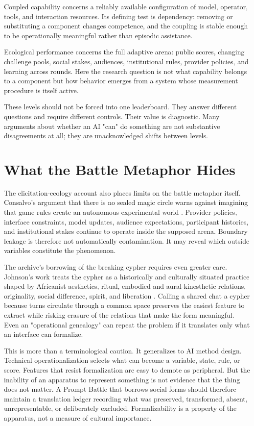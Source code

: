 \documentclass[11pt]{article}
\begin{document}
Coupled capability concerns a reliably available configuration of model, operator, tools, and interaction resources. Its defining test is dependency: removing or substituting a component changes competence, and the coupling is stable enough to be operationally meaningful rather than episodic assistance.

Ecological performance concerns the full adaptive arena: public scores, changing challenge pools, social stakes, audiences, institutional rules, provider policies, and learning across rounds. Here the research question is not what capability belongs to a component but how behavior emerges from a system whose measurement procedure is itself active.

These levels should not be forced into one leaderboard. They answer different questions and require different controls. Their value is diagnostic. Many arguments about whether an AI "can" do something are not substantive disagreements at all; they are unacknowledged shifts between levels.

\section{What the Battle Metaphor Hides}
The elicitation-ecology account also places limits on the battle metaphor itself. Consalvo's argument that there is no sealed magic circle warns against imagining that game rules create an autonomous experimental world \cite{consalvo2009magic}. Provider policies, interface constraints, model updates, audience expectations, participant histories, and institutional stakes continue to operate inside the supposed arena. Boundary leakage is therefore not automatically contamination. It may reveal which outside variables constitute the phenomenon.

The archive's borrowing of the breaking cypher requires even greater care. Johnson's work treats the cypher as a historically and culturally situated practice shaped by Africanist aesthetics, ritual, embodied and aural-kinesthetic relations, originality, social difference, spirit, and liberation \cite{johnson2023dark,johnson2011bboying}. Calling a shared chat a cypher because turns circulate through a common space preserves the easiest feature to extract while risking erasure of the relations that make the form meaningful. Even an "operational genealogy" can repeat the problem if it translates only what an interface can formalize.

This is more than a terminological caution. It generalizes to AI method design. Technical operationalization selects what can become a variable, state, rule, or score. Features that resist formalization are easy to demote as peripheral. But the inability of an apparatus to represent something is not evidence that the thing does not matter. A Prompt Battle that borrows social forms should therefore maintain a translation ledger recording what was preserved, transformed, absent, unrepresentable, or deliberately excluded. Formalizability is a property of the apparatus, not a measure of cultural importance.
\end{document}
